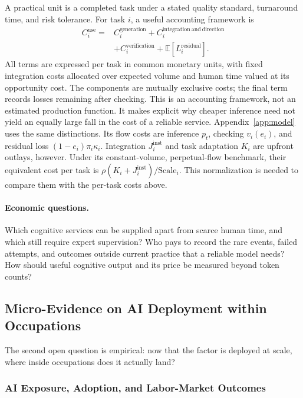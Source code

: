 \documentclass[12pt]{article}
\theoremstyle{plain}
\theoremstyle{definition}
\theoremstyle{remark}
\begin{document}
A practical unit is a completed task under a stated quality standard,
turnaround time, and risk tolerance. For task $i$, a useful accounting
framework is
\begin{equation}\label{eq:effectivecost}
\begin{aligned}
 C_i^{\mathrm{use}}
  ={}& C_i^{\mathrm{generation}}
      + C_i^{\mathrm{integration\ and\ direction}}\\
     &+ C_i^{\mathrm{verification}}
      + \mathbb{E}[L_i^{\mathrm{residual}}].
\end{aligned}
\end{equation}
All terms are expressed per task in common monetary units, with fixed
integration costs allocated over expected volume and human time valued
at its opportunity cost. The components are mutually exclusive costs;
the final term records losses remaining after checking. This is an
accounting framework, not an estimated production function. It makes
explicit why cheaper inference need not yield an equally large fall in
the cost of a reliable service. Appendix~\ref{app:model} uses the same
distinctions. Its flow costs are inference $p_t$, checking $v_i(e_i)$,
and residual loss $(1-e_i)\pi_i\kappa_i$. Integration
$J_i^{\mathrm{inst}}$ and task adaptation $K_i$ are upfront outlays,
however. Under its constant-volume, perpetual-flow benchmark, their
equivalent cost per task is $\rho(K_i+J_i^{\mathrm{inst}})/
\mathrm{Scale}_i$. This normalization is needed to compare them with
the per-task costs above.

\paragraph{Economic questions.}
Which cognitive services can be supplied apart from scarce human time,
and which still require expert supervision? Who pays to record the rare
events, failed attempts, and outcomes outside current practice that a
reliable model needs? How should useful cognitive output and its price
be measured beyond token counts?

\subsection{Micro-Evidence on AI Deployment within Occupations}
\label{subsec:deployment-skew}

The second open question is empirical: now that the factor is deployed at
scale, where inside occupations does it actually land?

\subsubsection{AI Exposure, Adoption, and Labor-Market Outcomes}
\end{document}
